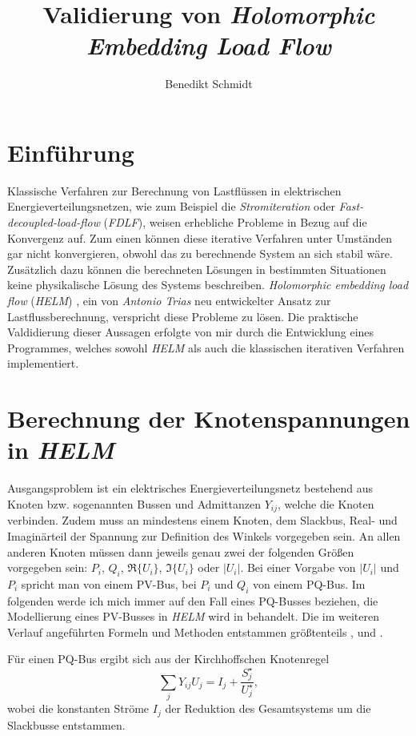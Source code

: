 \documentclass[12pt,a4paper]{article}
\author{Benedikt Schmidt}
\title{Validierung von \emph{Holomorphic Embedding Load Flow}}
\begin{document}
	\maketitle
	\newpage
	\tableofcontents
	\newpage
	
	\section{Einführung}
	Klassische Verfahren zur Berechnung von Lastflüssen in elektrischen Energieverteilungsnetzen, wie zum Beispiel die \emph{Stromiteration} oder \emph{Fast-de\-cou\-pled-load-flow} (\emph{FDLF}), weisen erhebliche Probleme in Bezug auf die Konvergenz auf. Zum einen können diese iterative Verfahren unter Umständen gar nicht konvergieren, obwohl das zu berechnende System an sich stabil wäre. Zusätzlich dazu können die berechneten Lösungen in bestimmten Situationen keine physikalische Lösung des Systems beschreiben. \emph{Holomorphic embedding load flow} (\emph{HELM}) \cite{helmIEEE}, ein von \emph{Antonio Trias} neu entwickelter Ansatz zur Lastflussberechnung, verspricht diese Probleme zu lösen. Die praktische Valdidierung dieser Aussagen erfolgte von mir durch die Entwicklung eines Programmes, welches sowohl \emph{HELM} als auch die klassischen iterativen Verfahren implementiert.
	
	\section{Berechnung der Knotenspannungen in \emph{HELM}}
	Ausgangsproblem ist ein elektrisches Energieverteilungsnetz bestehend aus Knoten bzw. sogenannten Bussen und Admittanzen $Y_{ij}$, welche die Knoten verbinden. Zudem muss an mindestens einem Knoten, dem Slackbus, Real- und Imaginärteil der Spannung zur Definition des Winkels vorgegeben sein. An allen anderen Knoten müssen dann jeweils genau zwei der folgenden Größen vorgegeben sein: $P_i$, $Q_i$, $\Re\{U_i\}$, $\Im\{U_i\}$ oder $|U_i|$. Bei einer Vorgabe von $|U_i|$ und $P_i$ spricht man von einem PV-Bus, bei $P_i$ und $Q_i$ von einem PQ-Bus. Im folgenden werde ich mich immer auf den Fall eines PQ-Busses beziehen, die Modellierung eines PV-Busses in \emph{HELM} wird in \cite{helmPV} behandelt. Die im weiteren Verlauf angeführten Formeln und Methoden entstammen größtenteils \cite{helmIEEE}, \cite{helmPatentApr2009} und \cite{helmPatentSept2009}.
	
	Für einen PQ-Bus ergibt sich aus der Kirchhoffschen Knotenregel
	\begin{equation}
		\sum_j Y_{ij} U_{j} = I_j + \frac{S_j^\star}{U_j^\star},
		\label{eq:loadflow}
	\end{equation}
	wobei die konstanten Ströme $I_j$ der Reduktion des Gesamtsystems um die Slackbusse entstammen.
	
\end{document}

